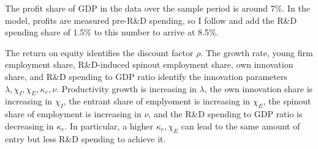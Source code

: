 \documentclass[11pt,english]{article}
\theoremstyle{remark}
\begin{document}
The profit share of GDP in the data over the sample period is around 7\%. In the model, profits are measured pre-R\&D spending, so I follow \cite{akcigit_growth_2018} and add the R\&D spending share of 1.5\% to this number to arrive at 8.5\%. 

The return on equity identifies the discount factor $\rho$. The growth rate, young firm employment share, R\&D-induced spinout employment share, own innovation share, and R\&D spending to GDP ratio identify the innovation parameters $\lambda, \chi_I, \chi_E, \kappa_e, \nu$. Productivity growth is increasing in $\lambda$, the own innovation share is increasing in $\chi_I$, the entrant share of emplyoment is increasing in $\chi_E$, the spinout share of employment is increasing in $\nu$, and the R\&D spending to GDP ratio is decreasing in $\kappa_e$. In particular, a higher $\kappa_e, \chi_E$ can lead to the same amount of entry but less R\&D spending to achieve it.
\end{document}
